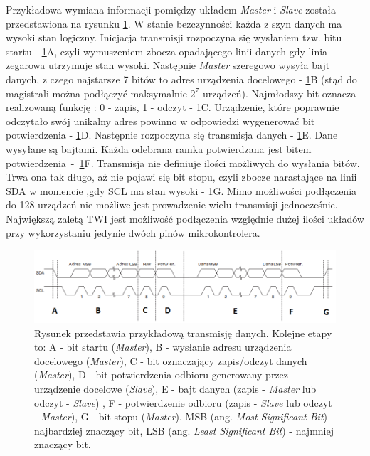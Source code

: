 \newline
\noindent
Przykładowa wymiana informacji pomiędzy układem \textit{Master} i \textit{Slave} została przedstawiona na rysunku \ref{trans_TWI}. W stanie bezczynności każda z szyn danych ma wysoki stan logiczny. Inicjacja transmisji rozpoczyna się wysłaniem tzw. bitu startu - \ref{trans_TWI}A, czyli wymuszeniem zbocza opadającego linii danych gdy linia zegarowa utrzymuje stan wysoki. Następnie \textit{Master} szeregowo wysyła bajt danych, z czego najstarsze 7 bitów to adres urządzenia docelowego - \ref{trans_TWI}B (stąd do magistrali można podłączyć maksymalnie $2^7$ urządzeń). Najmłodszy bit oznacza realizowaną funkcję : 0 - zapis, 1 - odczyt - \ref{trans_TWI}C. Urządzenie, które poprawnie odczytało swój unikalny adres powinno w odpowiedzi wygenerować bit potwierdzenia - \ref{trans_TWI}D. Następnie rozpoczyna się transmisja danych - \ref{trans_TWI}E. Dane wysyłane są bajtami. Każda odebrana ramka potwierdzana jest bitem potwierdzenia~-~\ref{trans_TWI}F. Transmisja nie definiuje ilości możliwych do wysłania bitów. Trwa ona tak długo, aż nie pojawi się bit stopu, czyli zbocze narastające na linii SDA w momencie ,gdy SCL ma stan wysoki - \ref{trans_TWI}G. Mimo możliwości podłączenia do 128 urządzeń nie możliwe jest prowadzenie wielu transmisji jednocześnie. Największą zaletą TWI jest możliwość podłączenia względnie dużej ilości układów przy wykorzystaniu jedynie dwóch pinów mikrokontrolera. 
\begin{figure}[H]
    \begin{center}
      \includegraphics[scale=0.6]{imgs/transmisja_twi.png}
 	\caption[Transmisja TWI.]{\small{Rysunek przedstawia przykładową transmisję danych. Kolejne etapy to: A - bit startu (\textit{Master}), B - wysłanie adresu urządzenia docelowego (\textit{Master}), C - bit oznaczający zapis/odczyt danych (\textit{Master}), D - bit potwierdzenia odbioru generowany przez urządzenie docelowe (\textit{Slave}), E - bajt danych (zapis - \textit{Master} lub odczyt - \textit{Slave}) , F - potwierdzenie odbioru (zapis - \textit{Slave} lub odczyt - \textit{Master}), G - bit stopu (\textit{Master}). MSB (ang. \textit{Most Significant Bit}) - najbardziej znaczący bit, LSB (ang. \textit{Least Significant Bit}) - najmniej znaczący bit. }\footnotemark}
	\label{trans_TWI}
    \end{center}
  \end{figure}  
  	  
